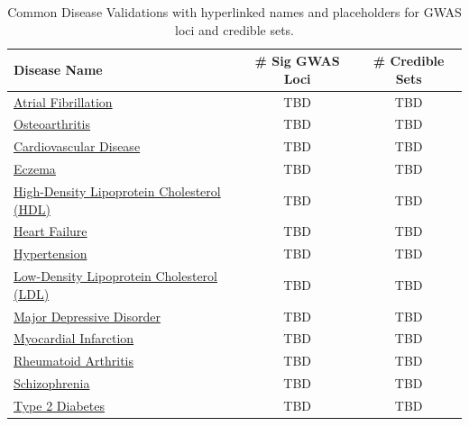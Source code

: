 \begin{table}[ht]
\centering
\footnotesize
\begin{tabular}{l c c}
\hline
\textbf{Disease Name} & \textbf{\# Sig GWAS Loci} & \textbf{\# Credible Sets} \\
\hline
\href{https://a2f.hugeamp.org/phenotype.html?phenotype=AF}{Atrial Fibrillation} & TBD & TBD \\
\href{https://a2f.hugeamp.org/phenotype.html?phenotype=ALLOA}{Osteoarthritis} & TBD & TBD \\
\href{https://a2f.hugeamp.org/phenotype.html?phenotype=AnyCVD}{Cardiovascular Disease} & TBD & TBD \\
\href{https://a2f.hugeamp.org/phenotype.html?phenotype=Eczema}{Eczema} & TBD & TBD \\
\href{https://a2f.hugeamp.org/phenotype.html?phenotype=HDL}{High-Density Lipoprotein Cholesterol (HDL)} & TBD & TBD \\
\href{https://a2f.hugeamp.org/phenotype.html?phenotype=HF}{Heart Failure} & TBD & TBD \\
\href{https://a2f.hugeamp.org/phenotype.html?phenotype=HYPERTENSION}{Hypertension} & TBD & TBD \\
\href{https://a2f.hugeamp.org/phenotype.html?phenotype=LDL}{Low-Density Lipoprotein Cholesterol (LDL)} & TBD & TBD \\
\href{https://a2f.hugeamp.org/phenotype.html?phenotype=MDD}{Major Depressive Disorder} & TBD & TBD \\
\href{https://a2f.hugeamp.org/phenotype.html?phenotype=MI}{Myocardial Infarction} & TBD & TBD \\
\href{https://a2f.hugeamp.org/phenotype.html?phenotype=RhA}{Rheumatoid Arthritis} & TBD & TBD \\
\href{https://a2f.hugeamp.org/phenotype.html?phenotype=SCZ}{Schizophrenia} & TBD & TBD \\
\href{https://a2f.hugeamp.org/phenotype.html?phenotype=T2D}{Type 2 Diabetes} & TBD & TBD \\
\hline
\end{tabular}
\caption{Common Disease Validations with hyperlinked names and placeholders for GWAS loci and credible sets.}
\label{tab:common-validation-traits}
\end{table}


